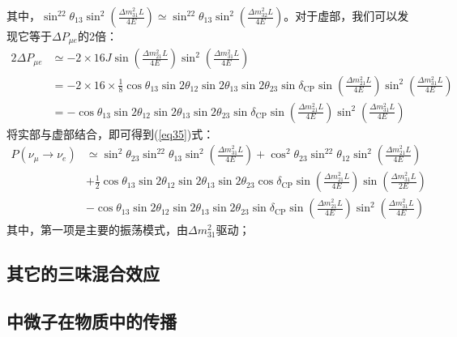 \documentclass{article}
\begin{document}
	其中，$\sin^22\theta_{13}\sin^2\left(\frac{\Delta m_{31}^2L}{4E}\right)\simeq\sin^22\theta_{13}\sin^2\left(\frac{\Delta m_{32}^2L}{4E}\right)$。对于虚部，我们可以发现它等于$\Delta P_{\mu e}$的2倍：
	\begin{equation*}
		\begin{aligned}
			2\Delta P_{\mu e}&\simeq-2\times16J\sin\left(\frac{\Delta m_{21}^2L}{4E}\right)\sin^2\left(\frac{\Delta m_{31}^2L}{4E}\right)\\
			&=-2\times16\times\frac{1}{8} \cos\theta_{13}\sin2\theta_{12}\sin2\theta_{13}\sin2\theta_{23}\sin\delta_{\mathrm{CP}}\sin\left(\frac{\Delta m_{21}^2L}{4E}\right)\sin^2\left(\frac{\Delta m_{31}^2L}{4E}\right)\\
			&=-\cos\theta_{13}\sin2\theta_{12}\sin2\theta_{13}\sin2\theta_{23}\sin\delta_{\mathrm{CP}}\sin\left(\frac{\Delta m_{21}^2L}{4E}\right)\sin^2\left(\frac{\Delta m_{31}^2L}{4E}\right)
		\end{aligned}
	\end{equation*}
	将实部与虚部结合，即可得到(\ref{eq35})式：
	\begin{equation*}
		\begin{aligned}P(\nu_\mu\to\nu_e)&\simeq\sin^2\theta_{23}\sin^22\theta_{13}\sin^2\left(\frac{\Delta m_{31}^2L}{4E}\right)+\cos^2\theta_{23}\sin^22\theta_{12}\sin^2\left(\frac{\Delta m_{21}^2L}{4E}\right)\\&+\frac{1}{2}\cos\theta_{13}\sin2\theta_{12}\sin2\theta_{13}\sin2\theta_{23}\cos\delta_{\mathrm{CP}}\sin\left(\frac{\Delta m_{21}^2L}{4E}\right)\sin\left(\frac{\Delta m_{31}^2L}{2E}\right)\\&-\cos\theta_{13}\sin2\theta_{12}\sin2\theta_{13}\sin2\theta_{23}\sin\delta_{\mathrm{CP}}\sin\left(\frac{\Delta m_{21}^2L}{4E}\right)\sin^2\left(\frac{\Delta m_{31}^2L}{4E}\right)\end{aligned}
	\end{equation*}
	其中，第一项是主要的振荡模式，由$\Delta m_{31}^2$驱动；
	
	
	
	
	
	
	
	
	
	
	
	
	
	
	
	\subsection{其它的三味混合效应}
	\subsection{中微子在物质中的传播\label{2.5}}
\end{document}
